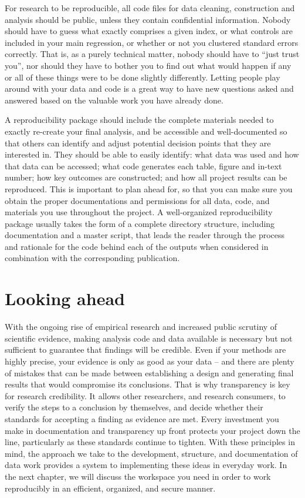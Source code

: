 For research to be reproducible,
all code files for data cleaning, construction and analysis
should be public, unless they contain confidential information.
Nobody should have to guess what exactly comprises a given index,
or what controls are included in your main regression,
or whether or not you clustered standard errors correctly.
That is, as a purely technical matter, nobody should have to ``just trust you'',
nor should they have to bother you to find out what would happen
if any or all of these things were to be done slightly differently.
Letting people play around with your data and code
is a great way to have new questions asked and answered
based on the valuable work you have already done.

A reproducibility package should include the complete materials needed
to exactly re-create your final analysis,
and be accessible and well-documented so that others can identify
and adjust potential decision points that they are interested in.
They should be able to easily identify:
what data was used and how that data can be accessed;
what code generates each table, figure and in-text number;
how key outcomes are constructed;
and how all project results can be reproduced.
This is important to plan ahead for,
so that you can make sure you obtain the proper
documentations and permissions
for all data, code, and materials you use throughout the project.
A well-organized reproducibility package usually takes the form
of a complete directory structure, including documentation and a master script,
that leads the reader through the process and rationale
for the code behind each of the outputs
when considered in combination with the corresponding publication.

\section{Looking ahead}
With the ongoing rise of empirical research and increased public scrutiny of scientific evidence,
making analysis code and data available
is necessary but not sufficient to guarantee that findings will be credible.
Even if your methods are highly precise,
your evidence is only as good as your data --
and there are plenty of mistakes that can be made between
establishing a design and generating final results that would compromise its conclusions.
That is why transparency is key for research credibility.
It allows other researchers, and research consumers,
to verify the steps to a conclusion by themselves,
and decide whether their standards for accepting a finding as evidence are met.
Every investment you make in documentation and transparency up front
protects your project down the line, particularly as these standards continue to tighten.
With these principles in mind,
the approach we take to the development, structure,
and documentation of data work
provides a system to implementing these ideas in everyday work.
In the next chapter, we will discuss the workspace you need
in order to work reproducibly in an efficient, organized, and secure manner.
